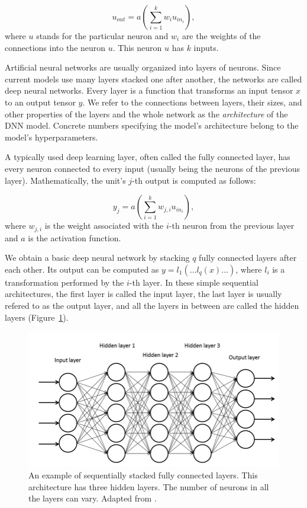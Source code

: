 \begin{equation}
u_{out} = a \left( \sum_{i=1}^k w_i u_{in_i} \right),
\end{equation}
where $u$ stands for the particular neuron and $w_i$ are the weights of the connections into the neuron $u$. This neuron $u$ has $k$ inputs.

Artificial neural networks are usually organized into layers of neurons. Since current models use many layers stacked one after another, the networks are called deep neural networks. Every layer is a function that transforms an input tensor $x$ to an output tensor $y$. We refer to the connections between layers, their sizes, and other properties of the layers and the whole network as the \emph{architecture} of the DNN model. Concrete numbers specifying the model’s architecture belong to the model’s hyperparameters. 

A typically used deep learning layer, often called the fully connected layer, has every neuron connected to every input (usually being the neurons of the previous layer). Mathematically, the unit’s $j$-th output is computed as follows: 

\begin{equation}
y_j = a\left(\sum_{i=1}^k w_{j,i} u_{in_i}\right),
\end{equation}
where $w_{j,i}$ is the weight associated with the $i$-th neuron from the previous layer and $a$ is the activation function.

We obtain a basic deep neural network by stacking $q$ fully connected layers after each other. Its output can be computed as $y = l_1(\dots l_q(x) \dots)$, where $l_i$ is a transformation performed by the $i$-th layer. In these simple sequential architectures, the first layer is called the input layer, the last layer is usually refered to as the output layer, and all the layers in between are called the hidden layers (Figure~\ref{img01:dnn}).

\begin{figure}[h]\centering
	\includegraphics[width=140mm]{../img/dnn.png}
	\caption{An example of sequentially stacked fully connected layers. This architecture has three hidden layers. The number of neurons in all the layers can vary. Adapted from \citep{miralles2017methodology}.}
	\label{img01:dnn}
\end{figure}


